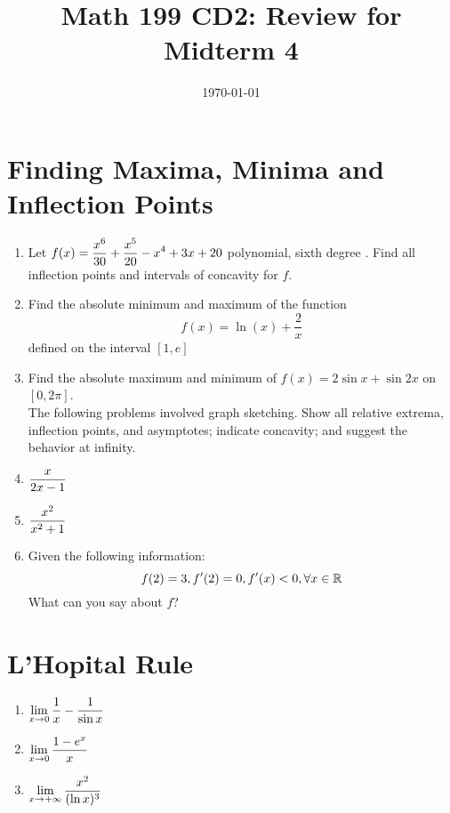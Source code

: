 




\title{Math 199 CD2: Review for Midterm 4}
\date{\today}



	
	\maketitle
	
	
	\section{Finding Maxima, Minima and Inflection Points}
	\begin{enumerate}
		\item Let $\displaystyle f(x)=\frac{x^6}{30}+\frac{x^5}{20}-x^4+3x+20$ polynomial, sixth degree . Find all inflection points and intervals of concavity for $f$.
		\vskip 5cm
	

		\item Find the absolute minimum and maximum of the function 
		$$f(x)=\ln(x) +\frac{2}{x}$$
		defined on the interval $[1,e]$
		\vskip 6cm

		\item Find the absolute maximum and minimum of $f(x) = 2\sin x + \sin2x$ on $[0,2\pi]$.\\
		\vskip 6cm
		The following problems involved graph sketching. Show all relative extrema, inflection points, and asymptotes; indicate concavity; and suggest the behavior at infinity.
		\item $\displaystyle \frac{x}{2x-1}$
		\vskip 4cm
		\item $\displaystyle \frac{x^2}{x^2+1}$
		\vskip 4cm
		\item Given the following information: 
		$$f(2) = 3, f'(2) = 0, f'(x)<0, \forall x \in \mathbb{R}$$
		What can you say about $f$?
		\vskip 4cm
	\end{enumerate}
	\section{L'Hopital Rule}
	\begin{enumerate}
		\item $\displaystyle \lim_{x \to 0}\frac{1}{x}-\frac{1}{\sin x}$
		\vskip 4cm
		\item $\displaystyle \lim_{x \to 0}\frac{1-e^x}{x}$
		\vskip 4cm
		\item $\displaystyle \lim_{x \to +\infty}\frac{x^2}{(\ln x)^3}$
		\vskip 4cm
	\end{enumerate}

